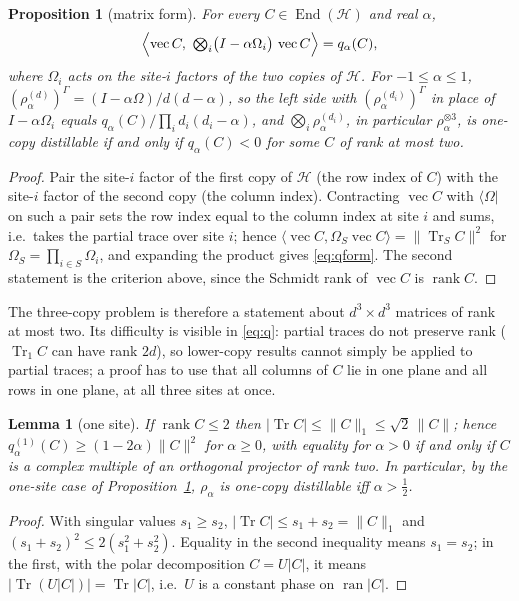 \documentclass[aps,pra,twocolumn,superscriptaddress,nofootinbib,longbibliography]{revtex4-2}
\newcommand{\Hh}{\mathcal H}
\newcommand{\ip}[2]{\langle #1,#2\rangle}
\newcommand{\bra}[1]{\langle #1|}
\newcommand{\Om}{\Omega}
\DeclareMathOperator{\Tr}{Tr}
\DeclareMathOperator{\ran}{ran}
\DeclareMathOperator{\rank}{rank}
\DeclareMathOperator{\End}{End}
\DeclareMathOperator{\vecop}{vec}
\theoremstyle{plain}
\newtheorem{lemma}[theorem]{Lemma}
\newtheorem{proposition}[theorem]{Proposition}
\theoremstyle{definition}
\theoremstyle{remark}
\begin{document}
\begin{proposition}[matrix form]\label{prop:qform}
For every $C\in\End(\Hh)$ and real $\alpha$,
\begin{equation}\label{eq:qform}
\Bigl\langle\vecop C,\ \textstyle\bigotimes_{i}\bigl(I-\alpha\Om_i\bigr)\,\vecop C\Bigr\rangle=q_\alpha(C) ,
\end{equation}
where $\Om_i$ acts on the site-$i$ factors of the two copies of $\Hh$. For $-1\le\alpha\le1$, $(\rho^{(d)}_\alpha)^\Gamma=(I-\alpha\Om)/d(d-\alpha)$, so the left side with $(\rho^{(d_i)}_\alpha)^\Gamma$ in place of $I-\alpha\Om_i$ equals $q_\alpha(C)/\prod_id_i(d_i-\alpha)$, and $\bigotimes_i\rho^{(d_i)}_\alpha$, in particular $\rho_\alpha^{\otimes3}$, is one-copy distillable if and only if $q_\alpha(C)<0$ for some $C$ of rank at most two.
\end{proposition}
\begin{proof}
Pair the site-$i$ factor of the first copy of $\Hh$ (the row index of $C$) with the site-$i$ factor of the second copy (the column index). Contracting $\vecop C$ with $\bra\Om$ on such a pair sets the row index equal to the column index at site $i$ and sums, i.e.\ takes the partial trace over site $i$; hence $\ip{\vecop C}{\Om_S\vecop C}=\|\Tr_SC\|^2$ for $\Om_S=\prod_{i\in S}\Om_i$, and expanding the product gives \eqref{eq:qform}. The second statement is the criterion above, since the Schmidt rank of $\vecop C$ is $\rank C$.
\end{proof}

The three-copy problem is therefore a statement about $d^3\times d^3$ matrices of rank at most two. Its difficulty is visible in \eqref{eq:q}: partial traces do not preserve rank ($\Tr_1C$ can have rank $2d$), so lower-copy results cannot simply be applied to partial traces; a proof has to use that all columns of $C$ lie in one plane and all rows in one plane, at all three sites at once.

\begin{lemma}[one site]\label{lem:onesite}
If $\rank C\le2$ then $|\Tr C|\le\|C\|_1\le\sqrt2\,\|C\|$; hence $q^{(1)}_\alpha(C)\ge(1-2\alpha)\|C\|^2$ for $\alpha\ge0$, with equality for $\alpha>0$ if and only if $C$ is a complex multiple of an orthogonal projector of rank two. In particular, by the one-site case of Proposition~\ref{prop:qform}, $\rho_\alpha$ is one-copy distillable iff $\alpha>\tfrac12$.
\end{lemma}
\begin{proof}
With singular values $s_1\ge s_2$, $|\Tr C|\le s_1+s_2=\|C\|_1$ and $(s_1+s_2)^2\le2(s_1^2+s_2^2)$. Equality in the second inequality means $s_1=s_2$; in the first, with the polar decomposition $C=U|C|$, it means $|\Tr(U|C|)|=\Tr|C|$, i.e.\ $U$ is a constant phase on $\ran|C|$.
\end{proof}
\end{document}
